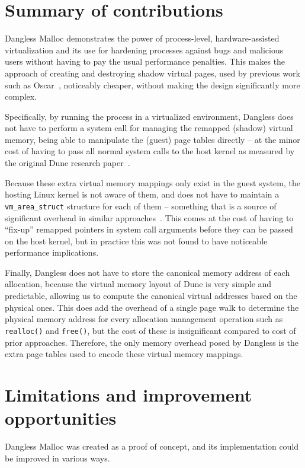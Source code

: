 \section{Summary of contributions}

Dangless Malloc demonstrates the power of process-level, hardware-assisted virtualization and its use for hardening processes against bugs and malicious users without having to pay the usual performance penalties. This makes the approach of creating and destroying shadow virtual pages, used by previous work such as Oscar~\cite{oscar2017}, noticeably cheaper, without making the design significantly more complex.

Specifically, by running the process in a virtualized environment, Dangless does not have to perform a system call for managing the remapped (shadow) virtual memory, being able to manipulate the (guest) page tables directly -- at the minor cost of having to pass all normal system calls to the host kernel as measured by the original Dune research paper~\cite{dune-paper}.

Because these extra virtual memory mappings only exist in the guest system, the hosting Linux kernel is not aware of them, and does not have to maintain a \lstinline!vm_area_struct! structure for each of them -- something that is a source of significant overhead in similar approaches~\cite{oscar2017}. This comes at the cost of having to ``fix-up'' remapped pointers in system call arguments before they can be passed on the host kernel, but in practice this was not found to have noticeable performance implications.

Finally, Dangless does not have to store the canonical memory address of each allocation, because the virtual memory layout of Dune is very simple and predictable, allowing us to compute the canonical virtual addresses based on the physical ones. This does add the overhead of a single page walk to determine the physical memory address for every allocation management operation such as \lstinline!realloc()! and \lstinline!free()!, but the cost of these is insignificant compared to cost of prior approaches. Therefore, the only memory overhead posed by Dangless is the extra page tables used to encode these virtual memory mappings.

\section{Limitations and improvement opportunities}

Dangless Malloc was created as a proof of concept, and its implementation could be improved in various ways.

